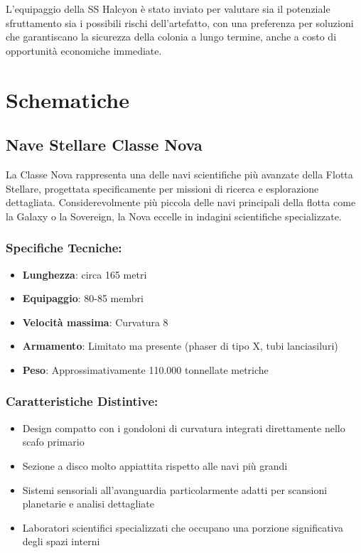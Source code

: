\documentclass[letterpaper,twocolumn,openany,nodeprecatedcode]{dndbook}
\begin{document}
L'equipaggio della SS Halcyon è stato inviato per valutare sia il potenziale sfruttamento sia i possibili rischi dell'artefatto, con una preferenza per soluzioni che garantiscano la sicurezza della colonia a lungo termine, anche a costo di opportunità economiche immediate.

\chapter{Schematiche}
\section{ Nave Stellare Classe Nova}

La Classe Nova rappresenta una delle navi scientifiche più avanzate della Flotta Stellare, progettata specificamente per missioni di ricerca e esplorazione dettagliata. Considerevolmente più piccola delle navi principali della flotta come la Galaxy o la Sovereign, la Nova eccelle in indagini scientifiche specializzate.

\subsection{Specifiche Tecniche:}
\begin{itemize}
    \item \textbf{Lunghezza}: circa 165 metri
    \item \textbf{Equipaggio}: 80-85 membri
    \item \textbf{Velocità massima}: Curvatura 8
    \item \textbf{Armamento}: Limitato ma presente (phaser di tipo X, tubi lanciasiluri)
    \item \textbf{Peso}: Approssimativamente 110.000 tonnellate metriche
\end{itemize}

\subsection{ Caratteristiche Distintive:}
\begin{itemize}
    \item Design compatto con i gondoloni di curvatura integrati direttamente nello scafo primario
    \item Sezione a disco molto appiattita rispetto alle navi più grandi
    \item Sistemi sensoriali all'avanguardia particolarmente adatti per scansioni planetarie e analisi dettagliate
    \item Laboratori scientifici specializzati che occupano una porzione significativa degli spazi interni
\end{itemize}
\end{document}

